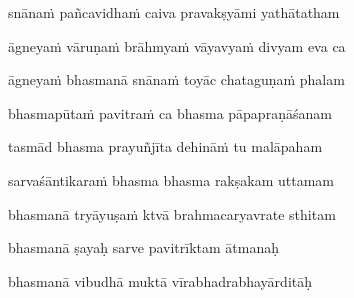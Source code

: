 \vers
{}


snānaṁ pañcavidhaṁ caiva pravakṣyāmi yathātatham\thinspace{\dandab} \dontdisplaylinenum
{}

āgneyaṁ vāruṇaṁ brāhmyaṁ vāyavyaṁ divyam eva ca \veg\dontdisplaylinenum
{}



āgneyaṁ bhasmanā snānaṁ toyāc chataguṇaṁ phalam\thinspace{\dandab} \dontdisplaylinenum
{}

bhasmapūtaṁ pavitraṁ ca bhasma pāpapraṇāśanam \veg\dontdisplaylinenum

tasmād bhasma prayuñjīta dehināṁ tu malāpaham\thinspace{\dandab} \dontdisplaylinenum
{}

sarvaśāntikaraṁ bhasma bhasma rakṣakam uttamam \veg\dontdisplaylinenum

bhasmanā tryāyuṣaṁ ktvā brahmacaryavrate sthitam\thinspace{\dandab} \dontdisplaylinenum
{}

bhasmanā ṣayaḥ sarve pavitrīktam ātmanaḥ \veg\dontdisplaylinenum
{}

bhasmanā vibudhā muktā vīrabhadrabhayārditāḥ\thinspace{\dandab} \dontdisplaylinenum
{}

